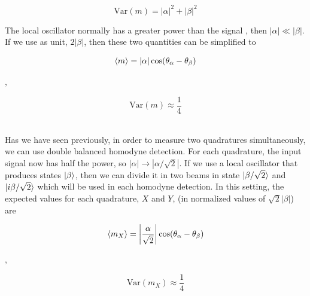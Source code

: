 \begin{bibunit}[plain]
\begin{center}
\begin{minipage}{46mm}
		\noindent
		\begin{equation}
			\textrm{Var}(m) = |\alpha|^2 + |\beta|^2
		\end{equation}
	\end{minipage}
\end{center}
%
The local oscillator normally has a greater power than the signal
, then $|\alpha| \ll |\beta|$. If we use as unit, $2|\beta|$, then these two quantities can be simplified to
%
\begin{center}
	\begin{minipage}{52mm}
		\noindent
		\begin{equation}
			\label{eq:var_m}
			\braket{m} = |\alpha|\cos({\theta_\alpha - \theta_\beta})
		\end{equation}
	\end{minipage}
	$,\quad$
	\begin{minipage}{34mm}
		\noindent
		\begin{equation}
			\textrm{Var}(m) \approx \frac{1}{4}
		\end{equation}
	\end{minipage}
\end{center}
%
\cite{hans2004}
\\
Has we have seen previously, in order to measure two quadratures simultaneously, we can use double balanced homodyne detection. For each quadrature, the input signal now has half the power, so $|\alpha| \rightarrow |\alpha/\sqrt{2}|$.  If we use a local oscillator that produces states $\ket{\beta}$, then we can divide it in two beams in state $\ket{\beta/\sqrt{2}}$ and $\ket{i\beta/\sqrt{2}}$ which will be used in each homodyne detection. In this setting, the expected values for each quadrature, $X$ and $Y$, (in normalized values of $\sqrt{2}|\beta|$) are
%
\begin{center}
	\begin{minipage}{58mm}
		\noindent
		\begin{equation}
			\braket{m_X} = \left|\frac{\alpha}{\sqrt{2}}\right| \cos({\theta_\alpha - \theta_\beta})
		\end{equation}
	\end{minipage}
	$,\quad$
	\begin{minipage}{37mm}
		\noindent
		\begin{equation}
			\textrm{Var}(m_X) \approx \frac{1}{4}
		\end{equation}
	\end{minipage}
\end{center}

\end{bibunit}
